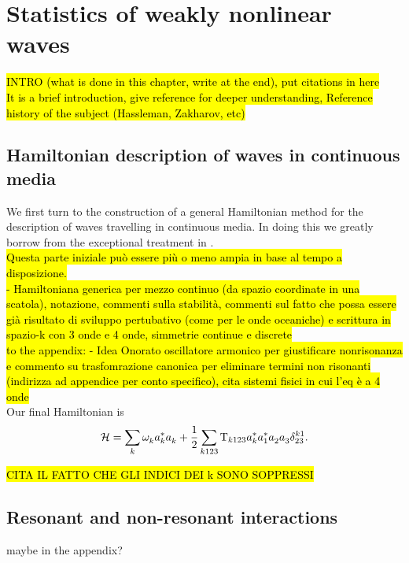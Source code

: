 \newpage
\phantom{}
\section{Statistics of weakly nonlinear waves}

\hl{INTRO (what is done in this chapter, write at the end), put citations in here \\
It is a brief introduction, give reference for deeper understanding, Reference history of the subject (Hassleman, Zakharov, etc)}


\subsection{Hamiltonian description of waves in continuous media}


We first turn to the construction of a general Hamiltonian method for the description of waves travelling in continuous media. In doing this
we greatly borrow from the exceptional treatment in \cite{Zakharov}. \\
\hl{Questa parte iniziale può essere più o meno ampia in base al tempo a disposizione. \\
- Hamiltoniana generica per mezzo continuo (da spazio coordinate in una scatola), notazione, commenti sulla stabilità, commenti sul fatto che possa essere
già risultato di sviluppo pertubativo (come per le onde oceaniche) e scrittura in spazio-k con 3 onde e 4 onde, simmetrie continue e discrete }\\

\hl{to the appendix: - Idea Onorato oscillatore armonico per giustificare nonrisonanza e commento su trasfomrazione canonica per eliminare termini 
non risonanti (indirizza ad appendice per conto specifico), cita sistemi fisici in cui l'eq è a 4 onde} \\

Our final Hamiltonian is 
\begin{equation}
    \mathcal{H} = \sum_k \omega^{}_k a_k^{*} a_k^{} + \frac{1}{2} \sum_{k123} \mathrm{T}_{k123} a_k^{*} a_1^{*} a_2^{} a_3^{} \delta_{23}^{k1}.
    \label{ham4}
\end{equation}

\hl{CITA IL FATTO CHE GLI INDICI DEI k SONO SOPPRESSI}
\subsection{Resonant and non-resonant interactions}
maybe in the appendix?

